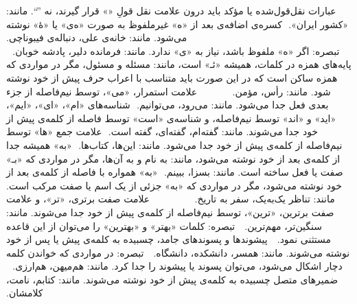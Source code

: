 ‫ 
‫عبارات نقل‌قول‌شده یا مؤکد باید درون علامت نقل قولِ «» قرار گیرند، نه ''``. مانند: «کشور ایران».
‫ 
‫کسره‌ی اضافه‌ی بعد از «ه» غیرملفوظ به صورت «ه‌ی» یا «هٔ» نوشته می‌شود. مانند: خانه‌ی علی، دنباله‌ی فیبوناچی.
‫\\
‫تبصره‌: اگر «ه» ملفوظ باشد، نیاز به «‌ی» ندارد. مانند: فرمانده دلیر، پادشه خوبان. 
‫
‫ 
‫پایه‌های همزه در کلمات، همیشه «ئـ» است، مانند: مسئله و مسئول، مگر در مواردی که همزه ساکن است که در این ‌صورت باید متناسب با اعراب حرف پیش از خود نوشته شود. مانند: رأس، مؤمن. 
‫
‫
‫
‫
‫
‫
‫
‫
‫
‫ 
‫علامت استمرار، «می»، توسط نیم‌فاصله از جزء‌ بعدی فعل جدا می‌شود. مانند: می‌رود، می‌توانیم.
‫ 
‫شناسه‌های «ام»، «ای»، «ایم»، «اید» و «اند» توسط نیم‌فاصله، و شناسه‌ی «است» توسط فاصله از کلمه‌ی پیش از خود جدا می‌شوند. مانند: گفته‌ام، گفته‌ای، گفته است.
‫ 
‫علامت جمع «ها» توسط نیم‌فاصله از کلمه‌ی پیش از خود جدا می‌شود. مانند: این‌ها، کتاب‌ها.
‫ 
‫«به» همیشه جدا از کلمه‌ی بعد از خود نوشته می‌شود، مانند: به‌ نام و به آن‌ها، مگر در مواردی که «بـ» صفت یا فعل ساخته است. مانند: بسزا، ببینم.
‫ 
‫«به» همواره با فاصله از کلمه‌ی بعد از خود نوشته می‌شود، مگر در مواردی که «به» جزئی از یک اسم یا صفت مرکب است. مانند: تناظر یک‌به‌یک، سفر به تاریخ. 
‫%
‫%
‫%
‫%
‫%
‫%
‫
‫%
‫%
‫%
‫%
‫
‫ 
‫علامت صفت برتری، «تر»، و علامت صفت برترین، «ترین»، توسط نیم‌فاصله از کلمه‌ی پیش از خود جدا می‌شوند. 
‫مانند: سنگین‌تر، مهم‌ترین.
‫
‫        تبصره‌: کلمات «بهتر» و «بهترین» را می‌توان از این قاعده مستثنی نمود. 
‫
‫ 
‫پیشوندها و پسوندهای جامد، چسبیده به کلمه‌ی پیش یا پس از خود نوشته می‌شوند. مانند: همسر، دانشکده، دانشگاه.
‫
‫        تبصره‌: در مواردی که خواندن کلمه دچار اشکال می‌شود، می‌توان پسوند یا پیشوند را جدا کرد. مانند: هم‌میهن، هم‌ارزی. 
‫
‫ 
‫ضمیرهای متصل چسبیده به کلمه‌ی پیش‌ از خود نوشته می‌شوند. مانند: کتابم، نامت، کلامشان. 
‫
‫
‫
‫
